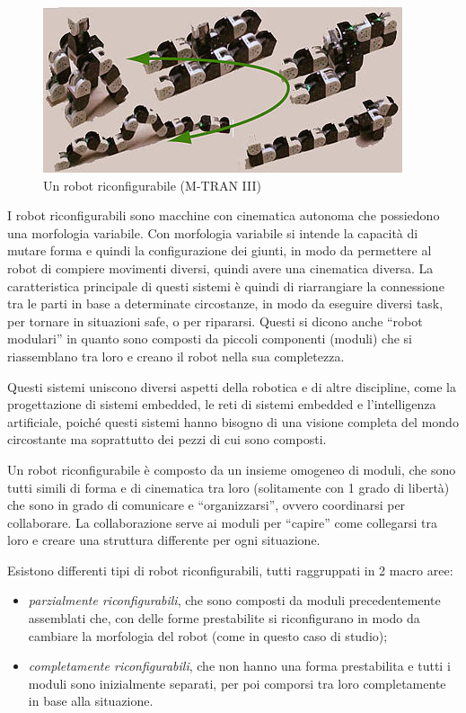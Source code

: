 \documentclass[a4paper,titlepage]{book}
\begin{document}
\begin{figure}[htbp]
\centering
\includegraphics[scale=0.5]{robot_riconfigurabile1.jpg}
\caption{Un robot riconfigurabile (M-TRAN III)}\label{fig:9}
\end{figure}

I robot riconfigurabili sono macchine con cinematica autonoma che possiedono una morfologia variabile. Con morfologia variabile si intende la capacità di mutare forma e quindi la configurazione dei giunti, in modo da permettere al robot di compiere movimenti diversi, quindi avere una cinematica diversa. La caratteristica principale di questi sistemi è quindi di riarrangiare la connessione tra le parti in base a determinate circostanze, in modo da eseguire diversi task, per tornare in situazioni safe, o per ripararsi.
Questi si dicono anche ``robot modulari'' in quanto sono composti da piccoli componenti (moduli) che si riassemblano tra loro e creano il robot nella sua completezza.

Questi sistemi uniscono diversi aspetti della robotica e di altre discipline, come la progettazione di sistemi embedded, le reti di sistemi embedded e l'intelligenza artificiale, poiché questi sistemi hanno bisogno di una visione completa del mondo circostante ma soprattutto dei pezzi di cui sono composti.

Un robot riconfigurabile è composto da un insieme omogeneo di moduli, che sono tutti simili di forma e di cinematica tra loro (solitamente con 1 grado di libertà) che sono in grado di comunicare e ``organizzarsi'', ovvero coordinarsi per collaborare. La collaborazione serve ai moduli per ``capire'' come collegarsi tra loro e creare una struttura differente per ogni situazione.

Esistono differenti tipi di robot riconfigurabili, tutti raggruppati in 2 macro aree:
\begin{itemize}
  \item \textit{parzialmente riconfigurabili}, che sono composti da moduli precedentemente assemblati che, con delle forme prestabilite si riconfigurano in modo da cambiare la morfologia del robot (come in questo caso di studio);
  \item \textit{completamente riconfigurabili}, che non hanno una forma prestabilita e tutti i moduli sono inizialmente separati, per poi comporsi tra loro completamente in base alla situazione.
\end{itemize}
\end{document}
